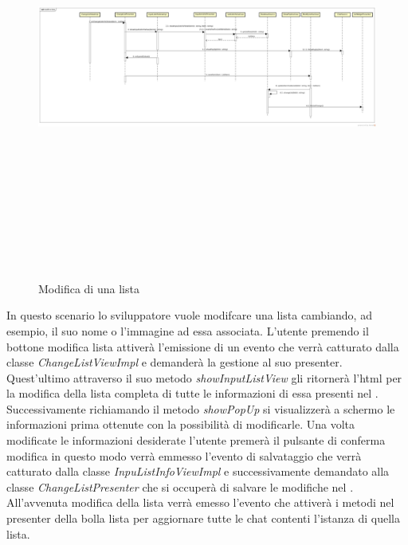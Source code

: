 \label{Modifca di un lista}
\begin{figure}[H]
	\centering
	\includegraphics[width=16cm, height=14cm]{Sezioni/Diagrammi/img_app/modifica_lista.jpg}
	\caption{Modifica di una lista}
\end{figure}

In questo scenario lo sviluppatore vuole modifcare una lista cambiando, ad esempio, il suo nome o l'immagine ad essa associata. L'utente premendo il bottone modifica lista attiverà l'emissione di un evento che verrà catturato dalla classe \textit{ChangeListViewImpl} e demanderà la  gestione al suo presenter. Quest'ultimo attraverso il suo  metodo \textit{showInputListView} gli ritornerà l'html per la modifica della lista completa di tutte le informazioni di essa presenti nel . Successivamente richiamando il metodo \textit{showPopUp} si visualizzerà a schermo  le informazioni prima ottenute con la possibilità di modificarle. Una volta modificate le informazioni desiderate l'utente premerà il pulsante di conferma modifica in questo modo verrà emmesso l'evento di salvataggio che verrà catturato dalla classe \textit{InpuListInfoViewImpl} e successivamente demandato alla classe \textit{ChangeListPresenter} che si occuperà di salvare le modifiche nel .
All'avvenuta modifica della lista  verrà emesso l'evento che attiverà i metodi nel presenter della bolla lista per aggiornare tutte le chat contenti l'istanza di quella lista.
 
